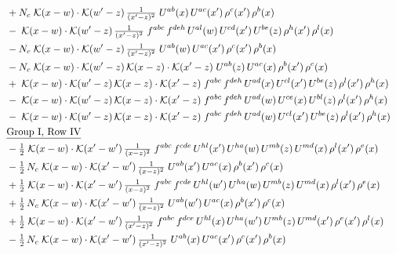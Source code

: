 \documentclass[10pt]{article}
\numberwithin{equation}{section}
\begin{document}
\begin{align}
&\quad +N_c\;\mathcal{K}(x-w)\cdot\mathcal{K}(w'-z)\,\tfrac{1}{(x'-z)^{2}}\;U^{ab}(x)\,U^{ac}(x')\,\rho^{c}(x')\,\rho^{b}(x)\notag\\
&\quad -\;\mathcal{K}(x-w)\cdot\mathcal{K}(w'-z)\,\tfrac{1}{(x'-z)^{2}}\;f^{abc}\,f^{deh}\,U^{al}(w)\,U^{cd}(x')\,U^{be}(z)\,\rho^{h}(x')\,\rho^{l}(x)\notag\\
&\quad -N_c\;\mathcal{K}(x-w)\cdot\mathcal{K}(w'-z)\,\tfrac{1}{(x'-z)^{2}}\;U^{ab}(w)\,U^{ac}(x')\,\rho^{c}(x')\,\rho^{b}(x)\notag\\
&\quad -N_c\;\mathcal{K}(x-w)\cdot\mathcal{K}(w'-z)\,\mathcal{K}(x-z)\cdot\mathcal{K}(x'-z)\;U^{ab}(z)\,U^{ac}(x)\,\rho^{b}(x')\,\rho^{c}(x)\notag\\
&\quad +\;\mathcal{K}(x-w)\cdot\mathcal{K}(w'-z)\,\mathcal{K}(x-z)\cdot\mathcal{K}(x'-z)\;f^{abc}\,f^{deh}\,U^{ad}(x)\,U^{cl}(x')\,U^{be}(z)\,\rho^{l}(x')\,\rho^{h}(x)\notag\\
&\quad -\;\mathcal{K}(x-w)\cdot\mathcal{K}(w'-z)\,\mathcal{K}(x-z)\cdot\mathcal{K}(x'-z)\;f^{abc}\,f^{deh}\,U^{ad}(w)\,U^{ce}(x)\,U^{bl}(z)\,\rho^{l}(x')\,\rho^{h}(x)\notag\\
&\quad -\;\mathcal{K}(x-w)\cdot\mathcal{K}(w'-z)\,\mathcal{K}(x-z)\cdot\mathcal{K}(x'-z)\;f^{abc}\,f^{deh}\,U^{ad}(w)\,U^{cl}(x')\,U^{be}(z)\,\rho^{l}(x')\,\rho^{h}(x)\notag\\
&\quad\underline{\text{Group I, Row IV}}\notag\\
&\quad -\tfrac{1}{2}\;\mathcal{K}(x-w)\cdot\mathcal{K}(x'-w')\,\tfrac{1}{(x-z)^{2}}\;f^{abc}\,f^{cde}\,U^{hl}(x')\,U^{ha}(w)\,U^{mb}(z)\,U^{md}(x)\,\rho^{l}(x')\,\rho^{e}(x)\notag\\
&\quad -\tfrac{1}{2}\,N_c\;\mathcal{K}(x-w)\cdot\mathcal{K}(x'-w')\,\tfrac{1}{(x-z)^{2}}\;U^{ab}(x')\,U^{ac}(x)\,\rho^{b}(x')\,\rho^{c}(x)\notag\\
&\quad +\tfrac{1}{2}\;\mathcal{K}(x-w)\cdot\mathcal{K}(x'-w')\,\tfrac{1}{(x-z)^{2}}\;f^{abc}\,f^{cde}\,U^{hl}(w')\,U^{ha}(w)\,U^{mb}(z)\,U^{md}(x)\,\rho^{l}(x')\,\rho^{e}(x)\notag\\
&\quad +\tfrac{1}{2}\,N_c\;\mathcal{K}(x-w)\cdot\mathcal{K}(x'-w')\,\tfrac{1}{(x-z)^{2}}\;U^{ab}(w')\,U^{ac}(x)\,\rho^{b}(x')\,\rho^{c}(x)\notag\\
&\quad +\tfrac{1}{2}\;\mathcal{K}(x-w)\cdot\mathcal{K}(x'-w')\,\tfrac{1}{(x'-z)^{2}}\;f^{abc}\,f^{dce}\,U^{hl}(x)\,U^{ha}(w')\,U^{mb}(z)\,U^{md}(x')\,\rho^{e}(x')\,\rho^{l}(x)\notag\\
&\quad -\tfrac{1}{2}\,N_c\;\mathcal{K}(x-w)\cdot\mathcal{K}(x'-w')\,\tfrac{1}{(x'-z)^{2}}\;U^{ab}(x)\,U^{ac}(x')\,\rho^{c}(x')\,\rho^{b}(x)\notag\\

\end{align}
\end{document}
